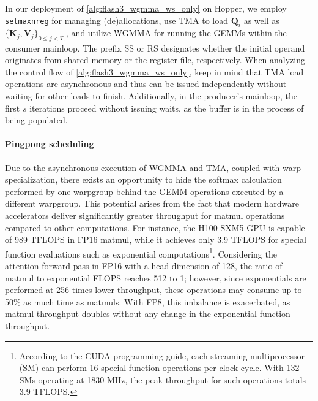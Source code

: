 In our deployment of \cref{alg:flash3_wgmma_ws_only} on Hopper, we employ \verb|setmaxnreg| for managing (de)allocations, use TMA to load $\mathbf{Q}_i$ as well as $\{ \mathbf{K}_j, \mathbf{V}_j \}_{0 \leq j < T_c}$, and utilize WGMMA for running the GEMMs within the consumer mainloop. The prefix SS or RS designates whether the initial operand originates from shared memory or the register file, respectively. When analyzing the control flow of \cref{alg:flash3_wgmma_ws_only}, keep in mind that TMA load operations are asynchronous and thus can be issued independently without waiting for other loads to finish. Additionally, in the producer’s mainloop, the first $s$ iterations proceed without issuing waits, as the buffer is in the process of being populated.

\paragraph{Pingpong scheduling} Due to the asynchronous execution of WGMMA and TMA, coupled with warp specialization, there exists an opportunity to hide the softmax calculation performed by one warpgroup behind the GEMM operations executed by a different warpgroup. This potential arises from the fact that modern hardware accelerators deliver significantly greater throughput for matmul operations compared to other computations. For instance, the H100 SXM5 GPU is capable of 989 TFLOPS in FP16 matmul, while it achieves only 3.9 TFLOPS for special function evaluations such as exponential computations\footnote{According to the CUDA programming guide, each streaming multiprocessor (SM) can perform 16 special function operations per clock cycle. With 132 SMs operating at 1830 MHz, the peak throughput for such operations totals 3.9 TFLOPS.}. Considering the attention forward pass in FP16 with a head dimension of 128, the ratio of matmul to exponential FLOPS reaches 512 to 1; however, since exponentials are performed at 256 times lower throughput, these operations may consume up to 50\% as much time as matmuls. With FP8, this imbalance is exacerbated, as matmul throughput doubles without any change in the exponential function throughput.

